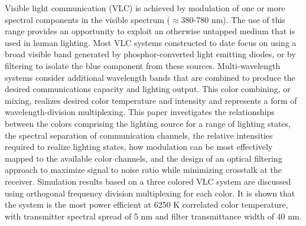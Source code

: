 Visible light communication (VLC) is achieved by modulation of one or more spectral components in the visible spectrum ($\approx$380-780 nm). The use of this range provides an opportunity to exploit an otherwise untapped medium that is used in human lighting. Most VLC systems constructed to date focus on using a broad visible band generated by phosphor-converted light emitting diodes, or by filtering to isolate the blue component from these sources. Multi-wavelength systems consider additional wavelength bands that are combined to produce the desired communications capacity and lighting output. This color combining, or mixing, realizes desired color temperature and intensity and represents a form of  wavelength-division multiplexing. This paper investigates the relationships between the colors comprising the lighting source for a range of lighting states, the spectral separation of communication channels, the relative intensities required to realize lighting states, how modulation can be most effectively mapped to the available color channels, and the design of an optical filtering approach to maximize signal to noise ratio while minimizing crosstalk at the receiver. Simulation results based on a three colored VLC system are discussed using orthogonal frequency division multiplexing for each color. It is shown that the system is the most power efficient at 6250 K correlated color temperature, with transmitter spectral spread of 5 nm and filter transmittance width of 40 nm.